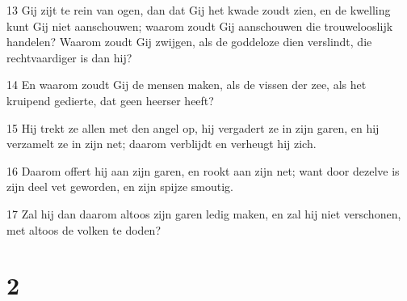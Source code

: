 \par 13 Gij zijt te rein van ogen, dan dat Gij het kwade zoudt zien, en de kwelling kunt Gij niet aanschouwen; waarom zoudt Gij aanschouwen die trouwelooslijk handelen? Waarom zoudt Gij zwijgen, als de goddeloze dien verslindt, die rechtvaardiger is dan hij?
\par 14 En waarom zoudt Gij de mensen maken, als de vissen der zee, als het kruipend gedierte, dat geen heerser heeft?
\par 15 Hij trekt ze allen met den angel op, hij vergadert ze in zijn garen, en hij verzamelt ze in zijn net; daarom verblijdt en verheugt hij zich.
\par 16 Daarom offert hij aan zijn garen, en rookt aan zijn net; want door dezelve is zijn deel vet geworden, en zijn spijze smoutig.
\par 17 Zal hij dan daarom altoos zijn garen ledig maken, en zal hij niet verschonen, met altoos de volken te doden?

\chapter{2}

